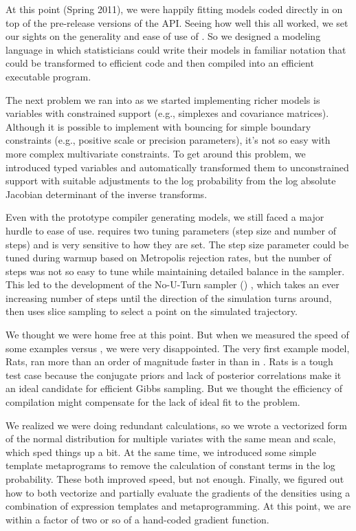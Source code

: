 At this point (Spring 2011), we were happily fitting models coded 
directly in \Cpp on top of the pre-release versions of the \Stan API. 
Seeing how well this all worked, we set our sights on the generality 
and ease of use of \BUGS.  So we designed a modeling language in which 
statisticians could write their models in familiar notation that could 
be transformed to efficient \Cpp code and then compiled into an 
efficient executable program.
 
The next problem we ran into as we started implementing richer models
is variables with constrained support (e.g., simplexes and covariance
matrices).  Although it is possible to implement \HMC with bouncing
for simple boundary constraints (e.g., positive scale or precision
parameters), it's not so easy with more complex multivariate
constraints.  To get around this problem, we introduced typed
variables and automatically transformed them to unconstrained support
with suitable adjustments to the log probability from the log absolute
Jacobian determinant of the inverse transforms.

Even with the prototype compiler generating models, we still faced a
major hurdle to ease of use.  \HMC requires two tuning parameters
(step size and number of steps) and is very sensitive to how they are
set.  The step size parameter could be tuned during warmup based on
Metropolis rejection rates, but the number of steps was not so easy to
tune while maintaining detailed balance in the sampler.  This led to
the development of the No-U-Turn sampler (\NUTS)
\citep{Hoffman-Gelman:2011, Hoffman-Gelman:2013}, which takes an ever
increasing number of steps until the direction of the simulation turns
around, then uses slice sampling to select a point on the simulated
trajectory.

We thought we were home free at this point.  But when we measured the
speed of some \BUGS examples versus \Stan, we were very disappointed.
The very first example model, Rats, ran more than an order of
magnitude faster in \JAGS than in \Stan.  Rats is a tough test case
because the conjugate priors and lack of posterior correlations make
it an ideal candidate for efficient Gibbs sampling.  But we thought
the efficiency of compilation might compensate for the lack of ideal
fit to the problem.  

We realized we were doing redundant calculations, so we wrote a
vectorized form of the normal distribution for multiple variates with
the same mean and scale, which sped things up a bit. At the same
time, we introduced some simple template metaprograms to remove the
calculation of constant terms in the log probability.  These both
improved speed, but not enough.  Finally, we figured out how to both
vectorize and partially evaluate the gradients of the densities using
a combination of expression templates and metaprogramming.  At this
point, we are within a factor of two or so of a hand-coded gradient
function.

